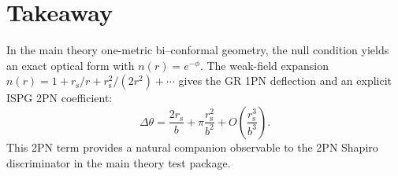 \documentclass[11pt]{article}
\newcommand{\rs}{r_{\mathrm{s}}}
\begin{document}
\section*{Takeaway}
In the main theory one-metric bi--conformal geometry, the null condition yields an exact optical form with $n(r)=e^{-\phi}$. The weak-field expansion $n(r)=1+\rs/r+\rs^2/(2r^2)+\cdots$ gives the GR 1PN deflection and an explicit ISPG 2PN coefficient:
\[
\Delta\theta=\frac{2\rs}{b}+\pi\frac{\rs^2}{b^2}+O\!\left(\frac{\rs^3}{b^3}\right).
\]
This 2PN term provides a natural companion observable to the 2PN Shapiro discriminator in the main theory test package.
\end{document}
